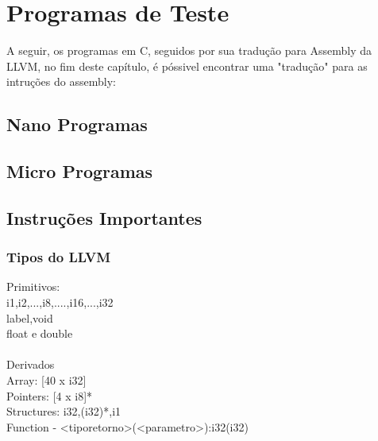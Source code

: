 \documentclass[12pt,a4paper,twoside]{report}
\begin{document}
\chapter{Programas de Teste}

A seguir, os programas em C, seguidos por sua tradução para Assembly da LLVM, no fim deste capítulo, é póssivel encontrar uma "tradução" para as intruções do assembly:

\section{Nano Programas}
%


\section{Micro Programas}


\section{Instruções Importantes}


\subsection{Tipos do LLVM}
Primitivos:\\
i1,i2,...,i8,....,i16,...,i32\\
label,void\\
float e double\\
\\
Derivados\\
Array: [40 x i32]\\
Pointers: [4 x i8]*\\
Structures: i32,(i32)*,i1\\
Function - <tiporetorno>(<parametro>):i32(i32)
\end{document}
